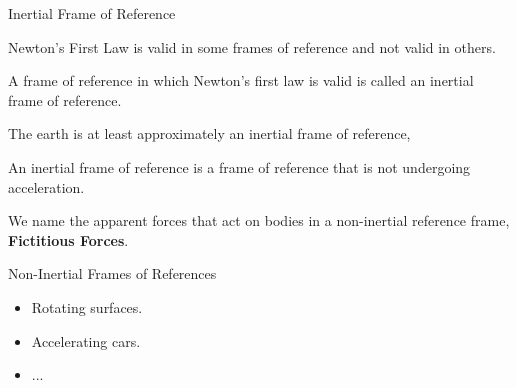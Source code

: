 \documentclass[]{beamer}
\begin{document}
 \begin{frame}
  Inertial Frame of Reference
    \vspace{5mm}
  

Newton's First Law is valid in some frames of reference and not valid in others. 
\vspace{3mm}
\pause

A frame of reference in which Newton’s first law is valid is called an inertial frame of
 reference.
 \vspace{3mm}
\pause

The earth is at least approximately an inertial frame of reference,

\vspace{3mm}
\pause

An inertial frame of reference is a frame of reference that is not undergoing acceleration.

\vspace{3mm}
\pause
We name the apparent forces that act on bodies in a non-inertial reference frame, 
\textbf{Fictitious Forces}.

\end{frame}





\begin{frame}
Non-Inertial Frames of References

\vspace{5mm}
  
\begin{itemize}
\item Rotating surfaces.
\item Accelerating cars.
\item ...
\end{itemize}
\end{frame}



\end{document}
